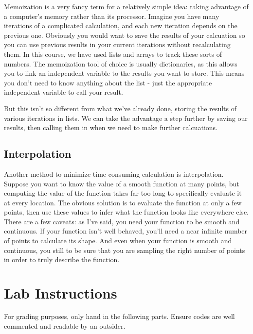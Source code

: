 \documentclass[a4paper,12pt]{article}
\begin{document}
Memoization is a very fancy term for a relatively simple idea: taking advantage of a computer's memory rather than its processor. Imagine you have many iterations of a complicated calculation, and each new iteration depends on the previous one. Obviously you would want to save the results of your calcuation so you can use previous results in your current iterations without recalculating them. In this course, we have used lists and arrays to track these sorts of numbers. The memoization tool of choice is usually dictionaries, as this allows you to link an independent variable to the results you want to store. This means you don't need to know anything about the list - just the appropriate independent variable to call your result.

But this isn't so different from what we've already done, storing the results of various iterations in lists. We can take the advantage a step further by saving our results, then calling them in when we need to make further calcuations.

\subsection{Interpolation}

Another method to minimize time consuming calculation is interpolation. Suppose you want to know the value of a smooth function at many points, but computing the value of the function takes far too long to specifically evaluate it at every location. The obvious solution is to evaluate the function at only a few points, then use these values to infer what the function looks like everywhere else. There are a few caveats: as I've said, you need your function to be smooth and continuous. If your function isn't well behaved, you'll need a near infinite number of points to calculate its shape. And even when your function is smooth and continuous, you still to be sure that you are sampling the right number of points in order to truly describe the function.

\section{Lab Instructions}

For grading purposes, only hand in the following parts. Ensure codes are well commented and readable by an outsider.
\end{document}
